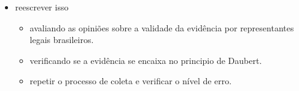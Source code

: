 \documentclass[
	12pt,				%
	openright,			%
	oneside,			%
	a4paper,			%
	english,			%
	french,				%
	spanish,			%
	brazil,				%
	]{abntex2}
\begin{document}
\begin{itemize}
 \item reescrever isso
 
 \begin{itemize}
  \item avaliando as opiniões sobre a validade da evidência por representantes legais brasileiros.
  \item verificando se a evidência se encaixa no principio de Daubert.
  \item repetir o processo de coleta e verificar o nível de erro.
 \end{itemize}

\end{itemize}







\printindex
\end{document}

